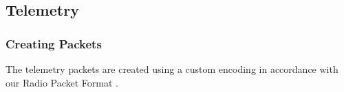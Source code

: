 \subsectionfont{\fontsize{14}{14}\selectfont}

\subsection{Telemetry}

\subsubsection{Creating Packets}
The telemetry packets are created using a custom encoding in accordance with our Radio Packet Format \cite{radio_packet_format}.

